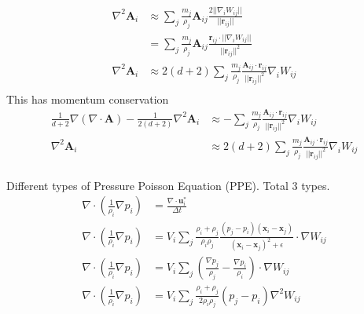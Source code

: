 \documentclass{article}
\newcommand{\xx}{\mathbf{x}}
\renewcommand{\AA}{\mathbf{A}}
\newcommand{\rr}{\mathbf{r}}
\newcommand{\uu}{\mathbf{u}}
\begin{document}
\begin{align*}
  \nabla^2 \AA_i &\approx  \sum_j \frac{m_j}{\rho_j} \AA_{ij} \frac{2 ||\nabla_i W_{ij} ||}{||\rr_{ij}||} \\
  &=  \sum_j \frac{m_j}{\rho_j} \AA_{ij} \frac{\rr_{ij} \cdot ||\nabla_i W_{ij} ||}{||\rr_{ij}||^2} \\
  \nabla^2 \AA_i &\approx 2(d+2) \sum_j \frac{m_j}{\rho_j} \frac{\AA_{ij} \cdot \rr_{ij} }{||\rr_{ij}||^2} \nabla_i W_{ij} \\
\end{align*}
This has momentum conservation
\begin{align*}
  \frac{1}{d+2} \nabla (\nabla \cdot \AA) - \frac{1}{2(d+2)} \nabla^2 \AA_i  &\approx - \sum_j \frac{m_j}{\rho_j} \frac{\AA_{ij} \cdot \rr_{ij}}{||\rr_{ij}||^2} \nabla_i W_{ij} \\
  \nabla^2 \AA_i &\approx 2(d+2) \sum_j \frac{m_j}{\rho_j} \frac{\AA_{ij} \cdot \rr_{ij}}{||\rr_{ij}||^2} \nabla_i W_{ij} \\
\end{align*}

Different types of Pressure Poisson Equation (PPE). Total 3 types.
\begin{align*}
  \nabla \cdot \left( \frac{1}{\rho_i} \nabla p_i \right) &= \frac{\nabla \cdot \uu_i^*}{\Delta t} \\
  \nabla \cdot \left( \frac{1}{\rho_i} \nabla p_i \right) &= V_i \sum_j \frac{\rho_i + \rho_j}{\rho_i \rho_j} \frac{(p_j - p_i) ( \xx_i - \xx_j ) }{ (\xx_i - \xx_j )^2 + \epsilon } \cdot \nabla W_{ij} \\
  \nabla \cdot \left( \frac{1}{\rho_i} \nabla p_i \right) &= V_i \sum_j \left( \frac{\nabla p_j}{\rho_j} - \frac{\nabla p_i}{\rho_i} \right) \cdot \nabla W_{ij} \\
  \nabla \cdot \left( \frac{1}{\rho_i} \nabla p_i \right) &= V_i \sum_j \frac{\rho_i + \rho_j}{2 \rho_i \rho_j} (p_j - p_i)  \nabla^2 W_{ij} 
\end{align*}




\end{document}
